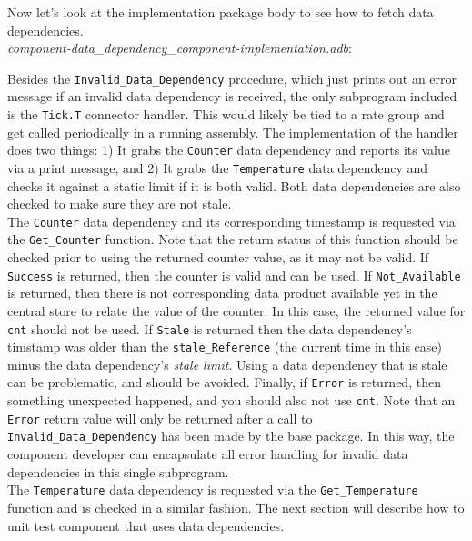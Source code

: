 Now let's look at the implementation package body to see how to fetch data dependencies. \\

\textit{component-data\_dependency\_component-implementation.adb}:

Besides the \texttt{Invalid\_Data\_Dependency} procedure, which just prints out an error message if an invalid data dependency is received, the only subprogram included is the \texttt{Tick.T} connector handler. This would likely be tied to a rate group and get called periodically in a running assembly. The implementation of the handler does two things: 1) It grabs the \texttt{Counter} data dependency and reports its value via a print message, and 2) It grabs the \texttt{Temperature} data dependency and checks it against a static limit if it is both valid. Both data dependencies are also checked to make sure they are not stale. \\

The \texttt{Counter} data dependency and its corresponding timestamp is requested via the \texttt{Get\_Counter} function. Note that the return status of this function should be checked prior to using the returned counter value, as it may not be valid. If \texttt{Success} is returned, then the counter is valid and can be used. If \texttt{Not\_Available} is returned, then there is not corresponding data product available yet in the central store to relate the value of the counter. In this case, the returned value for \texttt{cnt} should not be used. If \texttt{Stale} is returned then the data dependency's timstamp was older than the \texttt{stale\_Reference} (the current time in this case) minus the data dependency's \textit{stale limit}. Using a data dependency that is stale can be problematic, and should be avoided. Finally, if \texttt{Error} is returned, then something unexpected happened, and you should also not use \texttt{cnt}. Note that an \texttt{Error} return value will only be returned after a call to \texttt{Invalid\_Data\_Dependency} has been made by the base package. In this way, the component developer can encapsulate all error handling for invalid data dependencies in this single subprogram. \\

The \texttt{Temperature} data dependency is requested via the \texttt{Get\_Temperature} function and is checked in a similar fashion. The next section will describe how to unit test component that uses data dependencies. \\

